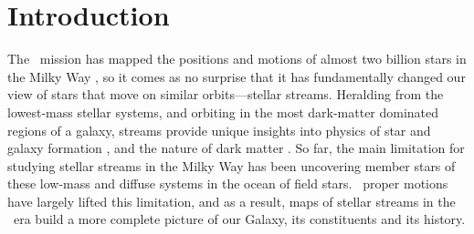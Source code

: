 \documentclass[final,5p,times,twocolumn,authoryear]{elsarticle}
\begin{document}
\begin{frontmatter}
%

\begin{keyword}



\end{keyword}

\end{frontmatter}


\section{Introduction}
\label{sec:intro}

The \gaia\ mission has mapped the positions and motions of almost two billion stars in the Milky Way \citep{gaiamission:2016, gaiadr1, gaiadr2, gaiaedr3, gaiadr3}, so it comes as no surprise that it has fundamentally changed our view of stars that move on similar orbits---stellar streams.
Heralding from the lowest-mass stellar systems, and orbiting in the most dark-matter dominated regions of a galaxy, streams provide unique insights into physics of star and galaxy formation \citep{}, and the nature of dark matter \citep{}.
So far, the main limitation for studying stellar streams in the Milky Way has been uncovering member stars of these low-mass and diffuse systems in the ocean of field stars.
\gaia\ proper motions have largely lifted this limitation, and as a result, maps of stellar streams in the \gaia\ era build a more complete picture of our Galaxy, its constituents and its history.
\end{document}
